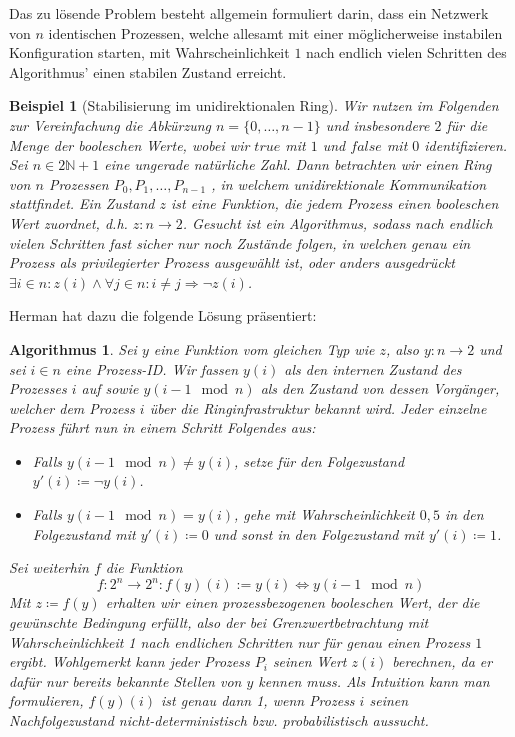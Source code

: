 \documentclass[a4paper]{article}
\newtheorem{beispiel}[satz]{Beispiel}
\newtheorem{algorithmus}[satz]{Algorithmus}
\theoremstyle{nonumberplain}
\begin{document}
Das zu lösende Problem besteht allgemein formuliert darin, dass ein Netzwerk von $n$ identischen Prozessen, welche allesamt mit einer möglicherweise instabilen Konfiguration starten, mit Wahrscheinlichkeit $1$ nach endlich vielen Schritten des Algorithmus' einen stabilen Zustand erreicht.

\begin{beispiel}[Stabilisierung im unidirektionalen Ring]
	\hspace{0.5em} Wir nutzen im Folgenden zur Vereinfachung die Abkürzung $n = \{0,\dots,n-1\}$ und insbesondere $2$ für die Menge der booleschen Werte, wobei wir $true$ mit $1$ und $false$ mit $0$ identifizieren.
	Sei $n \in 2\mathbb{N}+1$ eine ungerade natürliche Zahl. Dann betrachten wir einen Ring von $n$ Prozessen $P_0, P_1, \dots, P_{n-1}$ , in welchem unidirektionale Kommunikation stattfindet. Ein Zustand $z$ ist eine Funktion, die jedem Prozess einen booleschen Wert zuordnet, d.h. $z : n \to 2$.
	Gesucht ist ein Algorithmus, sodass nach endlich vielen Schritten fast sicher nur noch Zustände folgen, in welchen genau ein Prozess als privilegierter Prozess ausgewählt ist, oder anders ausgedrückt $\exists i \in n : z(i) \land \forall j \in n: i\neq j \Rightarrow \neg z(i)$.
\end{beispiel}

Herman hat dazu die folgende Lösung präsentiert:

\begin{algorithmus}\label{alg-herman}
	Sei $y$ eine Funktion vom gleichen Typ wie $z$, also $y : n \to 2$ und sei $i \in n$ eine Prozess-ID. Wir fassen $y(i)$ als den internen Zustand des Prozesses $i$ auf sowie $y(i - 1 \mod n)$ als den Zustand von dessen Vorgänger, welcher dem Prozess $i$ über die Ringinfrastruktur bekannt wird. Jeder einzelne Prozess führt nun in einem Schritt Folgendes aus:
	\begin{itemize}
		\item Falls $y(i-1 \mod n) \neq y(i)$, setze für den Folgezustand $y'(i) \coloneqq \neg y(i)$.
		\item Falls $y(i-1 \mod n) =    y(i)$, gehe mit Wahrscheinlichkeit $0,5$ in den Folgezustand mit $y'(i) \coloneqq 0$ und sonst in den Folgezustand mit $y'(i) \coloneqq 1$.
	\end{itemize}
	Sei weiterhin $f$ die Funktion
	\[
	f : 2^n \to 2^n : f(y)(i) :=  y(i) \Leftrightarrow y(i-1 \mod n)
	\]
	Mit $z \coloneqq f(y)$ erhalten wir einen prozessbezogenen booleschen Wert, der die gewünschte Bedingung erfüllt, also der bei Grenzwertbetrachtung mit Wahrscheinlichkeit 1 nach endlichen Schritten nur für genau einen Prozess $1$ ergibt. Wohlgemerkt kann jeder Prozess $P_i$ seinen Wert $z(i)$ berechnen, da er dafür nur bereits bekannte Stellen von $y$ kennen muss. Als Intuition kann man formulieren, $f(y)(i)$ ist genau dann 1, wenn Prozess $i$ seinen Nachfolgezustand nicht-deterministisch bzw. probabilistisch aussucht.
\end{algorithmus}
\end{document}
